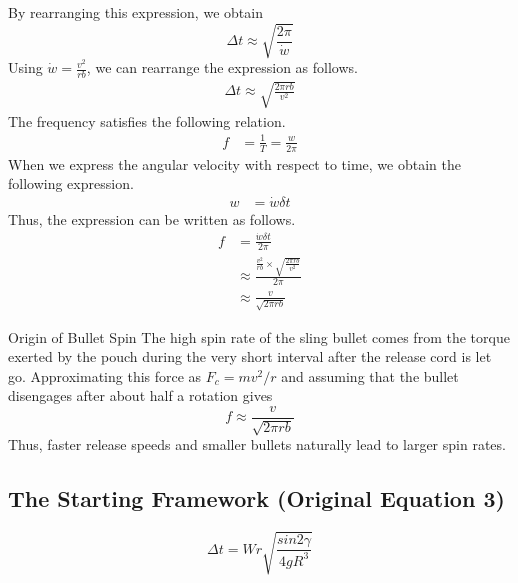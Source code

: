 \documentclass[11pt,letterpaper]{article}
\begin{document}
By rearranging this expression, we obtain
\begin{equation}
\Delta t \approx \sqrt{\frac{2\pi}{\dot{w}}}
\end{equation}
Using $\dot{w} = \frac{v^2}{rb}$, we can rearrange the expression as follows.
\begin{align*}
\Delta t \approx \sqrt{\frac{2\pi rb}{v^2}}
\end{align*}
The frequency satisfies the following relation.
\begin{align*}
f &= \frac{1}{T} = \frac{w}{2\pi}
\end{align*}
When we express the angular velocity with respect to time, we obtain the following expression.
\begin{align*}
w &= \dot{w}\delta t
\end{align*}
Thus, the expression can be written as follows.
\begin{align*}
f &= \frac{\dot{w}\delta t}{2\pi}\\
&\approx \frac{\frac{v^2}{rb} \times \sqrt{\frac{2\pi rb}{v^2}}}{2\pi}\\ &\approx \frac{v}{\sqrt{2\pi rb}}
\end{align*}
\begin{equationbreakdown}{Origin of Bullet Spin}
The high spin rate of the sling bullet comes from the torque exerted
by the pouch during the very short interval after the release cord is
let go. Approximating this force as \(F_c = mv^2/r\) and assuming that
the bullet disengages after about half a rotation gives
\begin{equation}
f \approx \frac{v}{\sqrt{2\pi rb}}
\end{equation}
Thus, faster release speeds and smaller bullets naturally lead to
larger spin rates.
\end{equationbreakdown}



\subsection{The Starting Framework (Original Equation 3)}

\begin{equation}
\Delta t = Wr\sqrt{\frac{sin2\gamma}{4gR^3}}
\end{equation}
\end{document}
